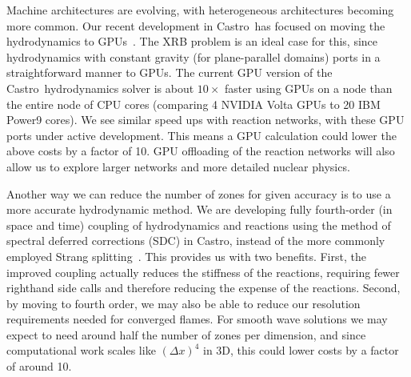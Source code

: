 \documentclass[a4paper]{jpconf}
\newcommand{\castro}{{\sffamily Castro}}
\begin{document}
Machine architectures are evolving, with heterogeneous architectures
becoming more common.  Our recent development in \castro\ has focused
on moving the hydrodynamics to GPUs~\cite{astronum:2017}.  The XRB
problem is an ideal case for this, since hydrodynamics with constant
gravity (for plane-parallel domains) ports in a straightforward manner
to GPUs.  The current GPU version of the \castro\ hydrodynamics solver
is about $10\times$ faster using GPUs on a node than the entire node
of CPU cores (comparing 4 NVIDIA Volta GPUs to 20 IBM Power9 cores).
We see similar speed ups with reaction networks, with these GPU ports
under active development.  This means a GPU calculation could lower
the above costs by a factor of 10.  GPU offloading of the reaction
networks will also allow us to explore larger networks and more
detailed nuclear physics.

Another way we can reduce the number of zones for given accuracy is to use a more
accurate hydrodynamic method.  We are developing fully
fourth-order (in space and time) coupling of hydrodynamics and
reactions using the method of spectral deferred corrections (SDC) in
\castro, instead of the more commonly employed Strang splitting~\cite{strang:1968}.  This
provides us with two benefits.  First, the improved coupling actually
reduces the stiffness of the reactions, requiring fewer righthand side
calls and therefore reducing the expense of the
reactions.  Second, by moving to fourth
order, we may also be able to reduce our resolution requirements
needed for converged flames. For smooth wave solutions we may expect to need
around half the number of zones per dimension, and since computational work
scales like $(\Delta x)^4$ in 3D, this could lower costs by a factor of around
10.
%
%
\end{document}
